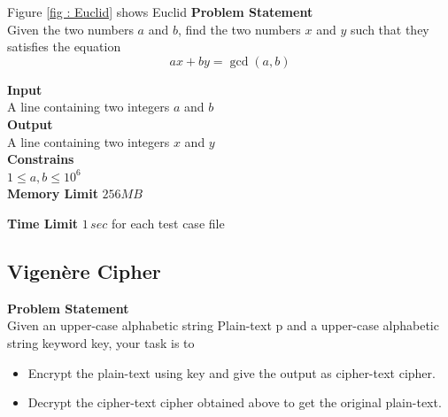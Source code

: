 \documentclass{article}
\begin{document}
Figure \ref{fig : Euclid} shows Euclid	
		\textbf{Problem Statement} \\
			Given the two numbers $a$ and $b$, find the two numbers $x$ and $y$ such that they satisfies the equation 
			\begin{equation}
    				a x + b y = \gcd(a,b)
			\end{equation}
			
		\textbf{Input} \\
				A line containing two integers $a$ and $b$ \\

		\textbf{Output} \\
				A line containing two integers $x$ and $y$ \\

		
			\textbf{Constrains} \\
			
				$1 \leq a,b \leq 10^{6}$\\


		
			\textbf{Memory Limit}
				$256 MB$
	
		 	\textbf{Time Limit}
				$1 \, sec$ for each test case file

	\subsection{Vigenère Cipher}
	
		\textbf{Problem Statement} \\
			Given an upper-case alphabetic string Plain-text p and a upper-case alphabetic string keyword  key, your task is to \\
		\begin{itemize}
			\item  Encrypt the plain-text using key and give the output as cipher-text cipher.
			\item  Decrypt the cipher-text cipher obtained above to get the original plain-text.
		\end{itemize}			
\end{document}
